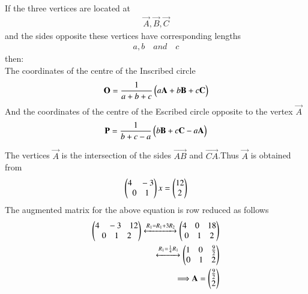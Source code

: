 
If the three vertices are located at\begin{align}
     \vec{A},\vec{B},\vec{C}
\end{align} 
and the sides opposite these vertices have corresponding lengths \begin{align}
{a}, {b}\quad and\quad {c} 
\end{align} 
then:\\
 The coordinates of the centre of the Inscribed circle
 \begin{align}
 \mathbf{O}=\frac{1}{{a}+{b}+{c}}\begin{pmatrix}{a}\mathbf{A}+{b} \mathbf{B}+{c}\mathbf{C}\end{pmatrix}
 \end{align} 
And the coordinates of the centre of the Escribed circle  opposite to the vertex $\vec{A}$
 \begin{align}
\mathbf{P}=\frac{1}{{b}+{c}-{a}}\begin{pmatrix} {b}\mathbf{B}+{c}\mathbf{C}-{a}\mathbf{A}\end{pmatrix}
 \end{align}
 
 The vertices $\vec{A}$ is the intersection of the sides $\vec{AB}$ and $\vec{CA}$.Thus $\vec{A}$ is obtained from
 \begin{align}
 \begin{pmatrix}4\quad-3\\0\quad1\end{pmatrix}x=\begin{pmatrix}12\\2\end{pmatrix}
 \end{align}
 The augmented matrix for the above equation is row reduced as follows
 \begin{align}
 \begin{pmatrix}4\quad-3\quad 12\\0\quad1\quad2\end{pmatrix}\xleftrightarrow{R_1=R_1+3R_2}\begin{pmatrix}4\quad0\quad 18\\0\quad1\quad2\end{pmatrix}\\\xleftrightarrow{R_1=\frac{1}{4}R_1}\begin{pmatrix}1\quad0\quad\frac{9}{2}\\0\quad1\quad2\end{pmatrix}\\
 \Longrightarrow\mathbf{A}=\begin{pmatrix}\frac{9}{2}\\2\end{pmatrix}
 \end{align}
 
